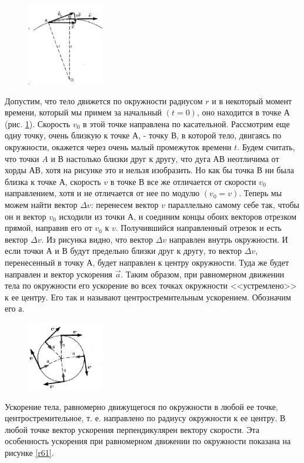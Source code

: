 \documentclass[a5paper, 10pt]{diss_4}
\renewcommand{\'}{\,'}
\begin{document}
\begin{figure}
\includegraphics[width=0.3\textwidth]{img/img_21.eps}
\caption{}
\label{r60}
\end{figure}
  Допустим, что тело движется по окружности радиусом $r$ и в некоторый момент
времени, который мы примем за начальный $(t = 0)$, оно находится в точке $А$
(рис. \ref{r60}). Скорость $v_0$ в этой точке направлена по касательной. Рассмотрим
еще одну точку, очень близкую к точке $А$, - точку $В$, в которой тело,
двигаясь по окружности, окажется через очень малый промежуток времени $t$.
Будем считать, что точки $A$ и $В$ настолько близки друг к другу, что дуга
$АВ$ неотличима от хорды $АВ$, хотя на рисунке это и нельзя изобразить. Но
как бы точка $В$ ни была близка к точке $А$, скорость $v$ в точке $В$ все же
отличается от скорости $v_0$ направлением, хотя и не отличается от нее по
модулю $(v_0 = v)$. Теперь мы можем найти вектор $\Delta v$: перенесем вектор
$v$ параллельно самому себе так, чтобы он и вектор $v_0$ исходили из точки
$А$, и соединим концы обоих векторов отрезком прямой, направив его от $v_0$ к
$v$. Получившийся направленный отрезок и есть вектор $\Delta v$. Из рисунка
видно, что вектор $\Delta v$ направлен внутрь окружности. И если точки $А$ и
$В$ будут предельно близки друг к другу, то вектор $\Delta v$, перенесенный в
точку $А$, будет направлен к центру окружности. Туда же будет направлен и
вектор ускорения $\vec{a}$. Таким образом, при равномерном движении тела по
окружности его ускорение во всех точках окружности <<устремлено>> к ее центру.
Его так и называют центростремительным ускорением. Обозначим его $а$.

\begin{figure}
\includegraphics[width=0.3\textwidth]{img/img_22.eps}
\caption{}
\label{r63}
\end{figure}
  Ускорение тела, равномерно движущегося по окружности в любой ее точке,
центростремительное, т. е. направлено по радиусу окружности к ее центру. В
любой точке вектор ускорения перпендикулярен вектору скорости. Эта особенность
ускорения при равномерном движении по окружности показана на рисунке \ref{r61}.
\end{document}
